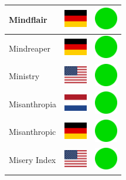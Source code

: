 \documentclass[12pt, a4paper, twoside]{report}
\begin{document}
\begin{center}
\begin{longtable}{|p{5cm}|p{2cm}|p{2cm}|}
Mindflair & \includegraphics[width=1cm]{4x3/de} & \includegraphics[width=1cm]{likes/y} \\ \hline
Mindreaper & \includegraphics[width=1cm]{4x3/de} & \includegraphics[width=1cm]{likes/y} \\ \hline
Ministry & \includegraphics[width=1cm]{4x3/us} & \includegraphics[width=1cm]{likes/y} \\ \hline
Misanthropia & \includegraphics[width=1cm]{4x3/nl} & \includegraphics[width=1cm]{likes/y} \\ \hline
Misanthropic & \includegraphics[width=1cm]{4x3/de} & \includegraphics[width=1cm]{likes/y} \\ \hline
Misery Index & \includegraphics[width=1cm]{4x3/us} & \includegraphics[width=1cm]{likes/y} \\ \hline

\end{longtable}
\end{center}
\end{document}
